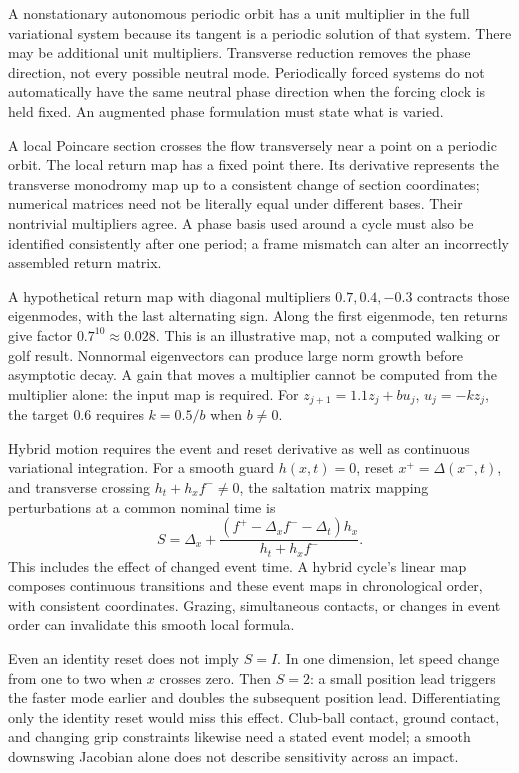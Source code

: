 A nonstationary autonomous periodic orbit has a unit multiplier in the full
variational system because its tangent is a periodic solution of that system.
There may be additional unit multipliers. Transverse reduction removes the
phase direction, not every possible neutral mode. Periodically forced systems
do not automatically have the same neutral phase direction when the forcing
clock is held fixed. An augmented phase formulation must state what is varied.

A local Poincare section crosses the flow transversely near a point on a
periodic orbit. The local return map has a fixed point there. Its derivative
represents the transverse monodromy map up to a consistent change of section
coordinates; numerical matrices need not be literally equal under different
bases. Their nontrivial multipliers agree. A phase basis used around a cycle
must also be identified consistently after one period; a frame mismatch can
alter an incorrectly assembled return matrix.

A hypothetical return map with diagonal multipliers $0.7,0.4,-0.3$ contracts
those eigenmodes, with the last alternating sign. Along the first eigenmode,
ten returns give factor $0.7^{10}\approx0.028$. This is an illustrative map,
not a computed walking or golf result. Nonnormal eigenvectors can produce
large norm growth before asymptotic decay. A gain that moves a multiplier
cannot be computed from the multiplier alone: the input map is required.
For $z_{j+1}=1.1z_j+b u_j$, $u_j=-kz_j$, the target $0.6$ requires
$k=0.5/b$ when $b\ne0$.

Hybrid motion requires the event and reset derivative as well as continuous
variational integration. For a smooth guard $h(x,t)=0$, reset
$x^+=\Delta(x^-,t)$, and transverse crossing
$h_t+h_xf^-\ne0$, the saltation matrix mapping perturbations at a common
nominal time is
\begin{equation}\label{eq:orbital_saltation}
 S=\Delta_x+
 \frac{(f^+-\Delta_x f^--\Delta_t)h_x}{h_t+h_xf^-}.
\end{equation}
This includes the effect of changed event time. A hybrid cycle's linear map
composes continuous transitions and these event maps in chronological order,
with consistent coordinates. Grazing, simultaneous contacts, or changes in
event order can invalidate this smooth local formula.

Even an identity reset does not imply $S=I$. In one dimension, let speed
change from one to two when $x$ crosses zero. Then $S=2$: a small position
lead triggers the faster mode earlier and doubles the subsequent position
lead. Differentiating only the identity reset would miss this effect.
Club-ball contact, ground contact, and changing grip constraints likewise
need a stated event model; a smooth downswing Jacobian alone does not
describe sensitivity across an impact.

